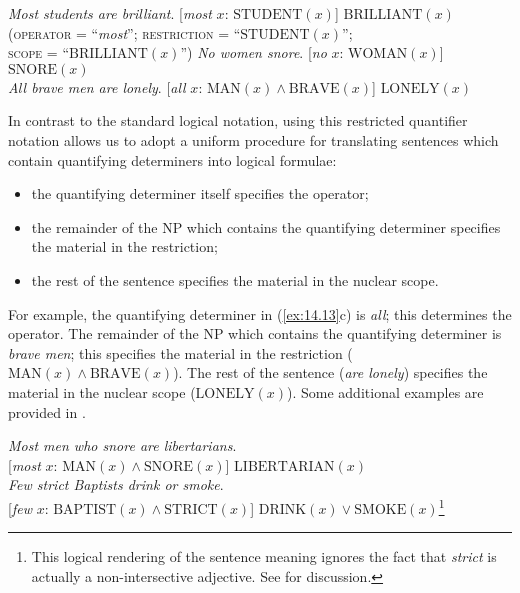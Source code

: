 \ea \label{ex:14.13}
\ea \textit{Most students are brilliant}.  [\textit{most} $x$: $\text{STUDENT}(x)$] $\text{BRILLIANT}(x)$\\
\hspace{35pt}\textsc{(operator} = “\textit{most}”; \textsc{restriction} = “$\text{STUDENT}(x)$”;\\
\hspace{40pt}\textsc{scope} = “$\text{BRILLIANT}(x)$”)
\ex  \textit{No women snore}.  [\textit{no} $x$: $\text{WOMAN}(x)$] $\text{SNORE}(x)$\\
\ex \textit{All brave men are lonely}.  [\textit{all} $x$: $\text{MAN}(x) \wedge \text{BRAVE}(x)$] $\text{LONELY}(x)$
\z \z


In contrast to the standard logical notation, using this restricted quantifier notation allows us to adopt a uniform procedure for translating sentences which contain quantifying determiners into logical formulae:


\begin{itemize}
\item the quantifying determiner itself specifies the operator;
\item the remainder of the NP which contains the quantifying determiner specifies the material in the restriction;
\item the rest of the sentence specifies the material in the nuclear scope.
\end{itemize}

For example, the quantifying determiner in (\ref{ex:14.13}c) is \textit{all}; this determines the operator. The remainder of the NP which contains the quantifying determiner is \textit{brave men}; this specifies the material in the restriction ($\text{MAN}(x) \wedge \text{BRAVE}(x)$). The rest of the sentence (\textit{are lonely}) specifies the material in the nuclear scope ($\text{LONELY}(x)$). Some additional examples are provided in .


\ea \label{ex:14.14}
\ea  \textit{Most men who snore are libertarians}.\\
  {}[\textit{most} $x$: $\text{MAN}(x) \wedge \text{SNORE}(x)$] $\text{LIBERTARIAN}(x)$\\
\ex \textit{Few strict Baptists drink or smoke}.\\
  {}[\textit{few} $x$: $\text{BAPTIST}(x) \wedge \text{STRICT}(x)$] $\text{DRINK}(x) \vee \text{SMOKE}(x)$\footnote{This logical rendering of the sentence meaning ignores the fact that \textit{strict} is actually a non-intersective adjective. See  for discussion.}
   \z
\z


